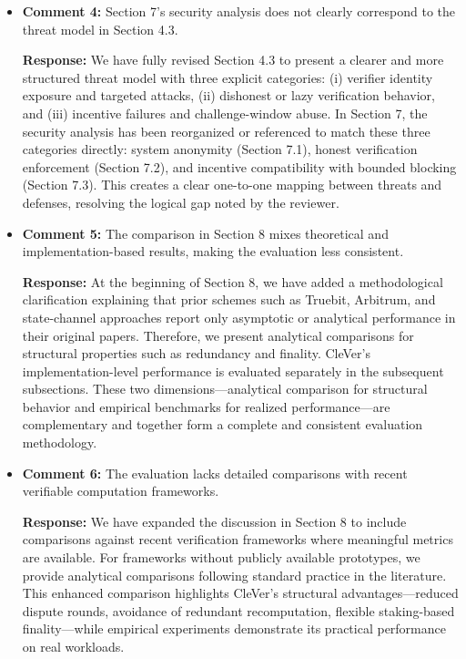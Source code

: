 \documentclass[3p]{elsarticle}
\theoremstyle{remark}
\begin{document}
\begin{itemize}
    \item \textbf{Comment 4:} 
    Section 7’s security analysis does not clearly correspond to the threat model in Section 4.3.

    \textbf{Response:} 
    We have fully revised Section 4.3 to present a clearer and more structured threat model with three explicit categories:  
    (i) verifier identity exposure and targeted attacks,  
    (ii) dishonest or lazy verification behavior, and  
    (iii) incentive failures and challenge-window abuse.  
    In Section 7, the security analysis has been reorganized or referenced to match these three categories directly:  
    system anonymity (Section 7.1), honest verification enforcement (Section 7.2), and incentive compatibility with bounded blocking (Section 7.3).  
    This creates a clear one-to-one mapping between threats and defenses, resolving the logical gap noted by the reviewer.

    \item \textbf{Comment 5:} 
    The comparison in Section 8 mixes theoretical and implementation-based results, making the evaluation less consistent.

    \textbf{Response:} 
    At the beginning of Section 8, we have added a methodological clarification explaining that prior schemes such as Truebit, Arbitrum, and state-channel approaches report only asymptotic or analytical performance in their original papers.  
    Therefore, we present analytical comparisons for structural properties such as redundancy and finality.  
    CleVer’s implementation-level performance is evaluated separately in the subsequent subsections.  
    These two dimensions—analytical comparison for structural behavior and empirical benchmarks for realized performance—are complementary and together form a complete and consistent evaluation methodology.

    \item \textbf{Comment 6:} 
    The evaluation lacks detailed comparisons with recent verifiable computation frameworks.

    \textbf{Response:} 
    We have expanded the discussion in Section 8 to include comparisons against recent verification frameworks where meaningful metrics are available. For frameworks without publicly available prototypes, we provide analytical comparisons following standard practice in the literature.  
    This enhanced comparison highlights CleVer’s structural advantages—reduced dispute rounds, avoidance of redundant recomputation, flexible staking-based finality—while empirical experiments demonstrate its practical performance on real workloads. \\

\end{itemize}
\end{document}
